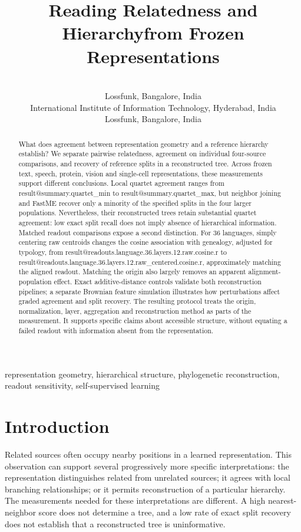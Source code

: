 \documentclass[mlmain]{jmlr}
\title[Reading Relatedness and Hierarchy]{Reading Relatedness and Hierarchy\titlebreak from Frozen Representations}
\author{\Name{Saket Atreya} \Email{saket.atreya@students.iiit.ac.in}\\
  \addr Lossfunk, Bangalore, India\\
  \addr International Institute of Information Technology, Hyderabad, India
  \AND
  \Name{Paras Chopra} \Email{paras@lossfunk.com}\\
  \addr Lossfunk, Bangalore, India}
\makeatletter
\newcommand{\Result}[1]{\csname result@#1\endcsname}
\makeatother
\begin{document}
\maketitle

\begin{abstract}
What does agreement between representation geometry and a reference hierarchy establish?
We separate pairwise relatedness, agreement on individual four-source comparisons, and recovery
of reference splits in a reconstructed tree. Across frozen text, speech, protein, vision and
single-cell representations, these measurements support different conclusions. Local quartet
agreement ranges from \Result{summary.quartet_min} to \Result{summary.quartet_max}, but neighbor joining
and FastME recover only a minority of the specified splits in the four larger populations.
Nevertheless, their reconstructed trees retain substantial quartet agreement: low exact split
recall does not imply absence of hierarchical information. Matched readout comparisons expose a
second distinction. For 36 languages, simply centering raw centroids changes the cosine association
with genealogy, adjusted for typology, from
\Result{readouts.language.36.layers.12.raw.cosine.r} to
\Result{readouts.language.36.layers.12.raw_centered.cosine.r}, approximately matching the aligned
readout. Matching the origin also largely removes an apparent alignment-population effect.
Exact additive-distance controls validate both reconstruction pipelines; a separate Brownian
feature simulation illustrates how perturbations affect graded agreement and split recovery.
The resulting protocol treats the origin, normalization, layer, aggregation and reconstruction
method as parts of the measurement. It supports specific claims about accessible structure,
without equating a failed readout with information absent from the representation.
\end{abstract}

\begin{keywords}
representation geometry, hierarchical structure, phylogenetic reconstruction, readout sensitivity,
self-supervised learning
\end{keywords}

\section{Introduction}

Related sources often occupy nearby positions in a learned representation. This observation can
support several progressively more specific interpretations: the representation distinguishes
related from unrelated sources; it agrees with local branching relationships; or it permits
reconstruction of a particular hierarchy. The measurements needed for these interpretations are
different. A high nearest-neighbor score does not determine a tree, and a low rate of exact split
recovery does not establish that a reconstructed tree is uninformative.
\end{document}
